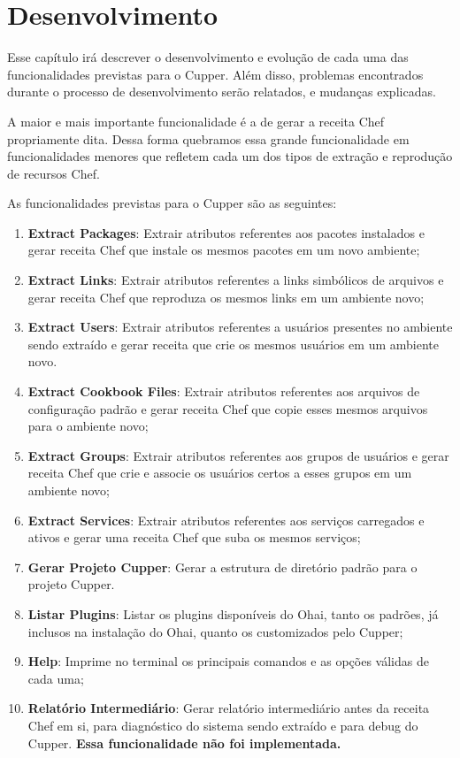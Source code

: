 \newpage\null\thispagestyle{empty}\newpage
\chapter{Desenvolvimento}
\label{chap:dev}

Esse capítulo irá descrever o desenvolvimento e evolução de cada uma das funcionalidades
previstas para o Cupper. Além disso, problemas encontrados durante o processo
de desenvolvimento serão relatados, e mudanças explicadas.

A maior e mais importante funcionalidade é a de gerar a receita Chef propriamente dita.
Dessa forma quebramos essa grande funcionalidade em funcionalidades menores que refletem cada
um dos tipos de extração e reprodução de recursos Chef.

As funcionalidades previstas para o Cupper são as seguintes:

\begin{enumerate}
  \item \textbf{Extract Packages}: Extrair atributos referentes aos pacotes
instalados e gerar receita Chef que instale os mesmos pacotes em um novo ambiente;
  \item \textbf{Extract Links}: Extrair atributos referentes a links simbólicos
de arquivos e gerar receita Chef que reproduza os mesmos links em um ambiente novo;
  \item \textbf{Extract Users}: Extrair atributos referentes a usuários presentes
no ambiente sendo extraído e gerar receita que crie os mesmos usuários em um
ambiente novo.
  \item \textbf{Extract Cookbook Files}: Extrair atributos referentes aos arquivos
de configuração padrão e gerar receita Chef que copie esses mesmos arquivos para o ambiente novo;
  \item \textbf{Extract Groups}: Extrair atributos referentes aos grupos de usuários
e gerar receita Chef que crie e associe os usuários certos a esses grupos em um
ambiente novo;
  \item \textbf{Extract Services}: Extrair atributos referentes aos serviços carregados
e ativos e gerar uma receita Chef que suba os mesmos serviços;
  \item \textbf{Gerar Projeto Cupper}: Gerar a estrutura de diretório padrão 
para o projeto Cupper.
  \item \textbf{Listar Plugins}: Listar os plugins disponíveis do Ohai, tanto 
os padrões, já inclusos na instalação do Ohai, quanto os customizados pelo Cupper;
  \item \textbf{Help}: Imprime no terminal os principais comandos e as opções
válidas de cada uma;
  \item \textbf{Relatório Intermediário}: Gerar relatório intermediário antes
da receita Chef em si, para diagnóstico do sistema sendo extraído e para debug
do Cupper. \textbf{Essa funcionalidade não foi implementada.}

\end{enumerate}

